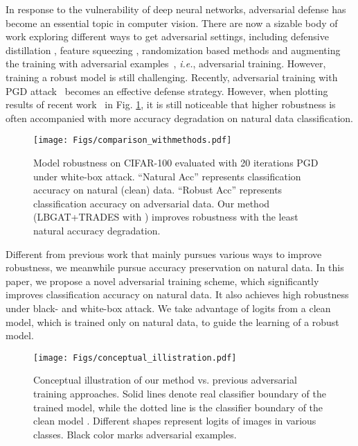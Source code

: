 \documentclass[10pt,twocolumn,letterpaper]{article}
\begin{document}
In response to the vulnerability of deep neural networks, adversarial defense has become an essential topic in computer vision. There are now a sizable body of work exploring different ways to get adversarial settings, including defensive distillation \cite{DBLP:conf/sp/PapernotM0JS16}, feature squeezing \cite{DBLP:conf/ndss/Xu0Q18}, randomization based methods \cite{DBLP:conf/iclr/XieWZRY18,DBLP:conf/iclr/DhillonALBKKA18} and augmenting the training with adversarial examples~\cite{zhang2019theoretically,DBLP:journals/corr/abs-1803-06373,DBLP:conf/iclr/MadryMSTV18,DBLP:conf/iclr/TramerKPGBM18}, {\it i.e.}, adversarial training. However, training a robust model is still challenging. Recently, adversarial training with PGD attack~\cite{DBLP:conf/iclr/MadryMSTV18} becomes an effective defense strategy. However, when plotting results of recent work~\cite{zhang2019theoretically,DBLP:journals/corr/abs-1803-06373,DBLP:conf/iclr/MadryMSTV18} in Fig. \ref{fig:comparison_methods}, it is still noticeable that higher robustness is often accompanied with more accuracy degradation on natural data classification. 

\begin{figure}
	\begin{center}
		\texttt{[image: Figs/comparison\_withmethods.pdf]}
		\caption{Model robustness on CIFAR-100 evaluated with 20 iterations PGD under white-box attack. ``Natural Acc'' represents classification accuracy on natural (clean) data. ``Robust Acc'' represents classification accuracy on adversarial data.
			Our method (LBGAT+TRADES with ) improves robustness with the least natural accuracy degradation.}
		\label{fig:comparison_methods}
	\end{center}
	\vspace{-0.3in}
\end{figure}

Different from previous work that mainly pursues various ways to improve robustness, we meanwhile pursue accuracy preservation on natural data.
In this paper, we propose a novel adversarial training scheme, which significantly improves classification accuracy on natural data. It also achieves high robustness under black- and white-box attack. We take advantage of logits from a clean model, which is trained only on natural data, to guide the learning of a robust model. 

\begin{figure*}[t]
	\begin{center}
		\texttt{[image: Figs/conceptual\_illistration.pdf]}
		\caption{Conceptual illustration of our method vs. previous adversarial training approaches. Solid lines denote real classifier boundary of the trained model, while the dotted line is the classifier boundary of the clean model . Different shapes represent logits of images in various classes. Black color marks adversarial examples.} 
		\label{fig:illustration}
	\end{center}
	\vspace{-0.2in}
\end{figure*}
\end{document}
